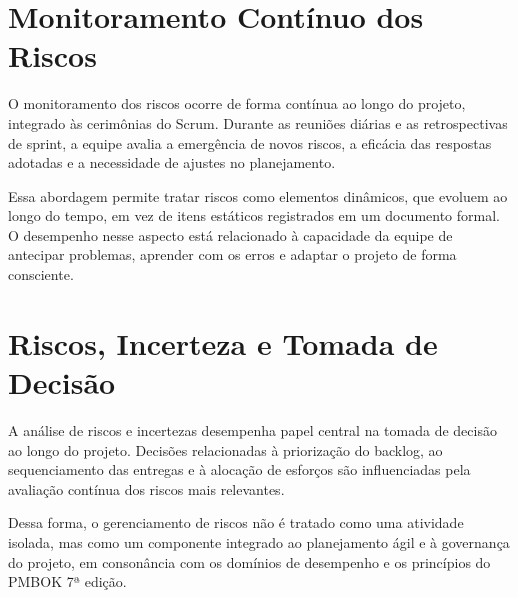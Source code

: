 \section{Monitoramento Contínuo dos Riscos}

O monitoramento dos riscos ocorre de forma contínua ao longo do projeto, integrado às cerimônias do Scrum. Durante as reuniões diárias e as retrospectivas de sprint, a equipe avalia a emergência de novos riscos, a eficácia das respostas adotadas e a necessidade de ajustes no planejamento.

Essa abordagem permite tratar riscos como elementos dinâmicos, que evoluem ao longo do tempo, em vez de itens estáticos registrados em um documento formal. O desempenho nesse aspecto está relacionado à capacidade da equipe de antecipar problemas, aprender com os erros e adaptar o projeto de forma consciente.

\section{Riscos, Incerteza e Tomada de Decisão}

A análise de riscos e incertezas desempenha papel central na tomada de decisão ao longo do projeto. Decisões relacionadas à priorização do backlog, ao sequenciamento das entregas e à alocação de esforços são influenciadas pela avaliação contínua dos riscos mais relevantes.

Dessa forma, o gerenciamento de riscos não é tratado como uma atividade isolada, mas como um componente integrado ao planejamento ágil e à governança do projeto, em consonância com os domínios de desempenho e os princípios do PMBOK 7ª edição.
